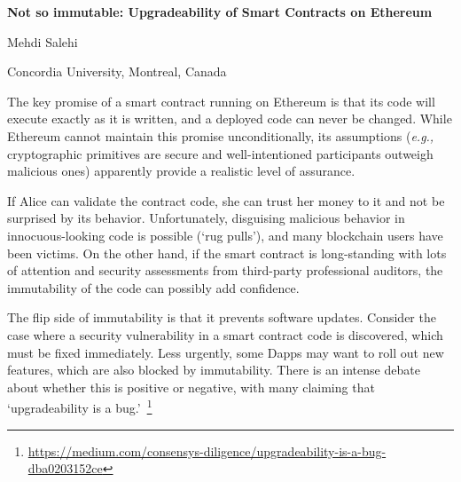 \documentclass[a4paper]{article}
\newcommand{\eg}{\textit{e.g.,}\xspace}
\begin{document}

\Large
 \begin{center}
\textbf{Not so immutable: Upgradeability of Smart Contracts on Ethereum}\\ 

\hspace{10pt}

\large
Mehdi Salehi \\

\hspace{10pt}

\small  
 Concordia University, Montreal, Canada

\end{center}

\hspace{10pt}

\normalsize

The key promise of a smart contract running on Ethereum is that its code will execute exactly as it is written, and a deployed code can never be changed. While Ethereum cannot maintain this promise unconditionally, its assumptions (\eg cryptographic primitives are secure and well-intentioned participants outweigh malicious ones) apparently provide a realistic level of assurance. 

If Alice can validate the contract code, she can trust her money to it and not be surprised by its behavior. Unfortunately, disguising malicious behavior in innocuous-looking code is possible (`rug pulls'), and many blockchain users have been victims. On the other hand, if the smart contract is long-standing with lots of attention and security assessments from third-party professional auditors, the immutability of the code can possibly add confidence. 

The flip side of immutability is that it prevents software updates. Consider the case where a security vulnerability in a smart contract code is discovered, which must be fixed immediately. Less urgently, some Dapps may want to roll out new features, which are also blocked by immutability. There is an intense debate about whether this is positive or negative, with many claiming that `upgradeability is a bug.'~\footnote{\url{https://medium.com/consensys-diligence/upgradeability-is-a-bug-dba0203152ce}}
\end{document}
